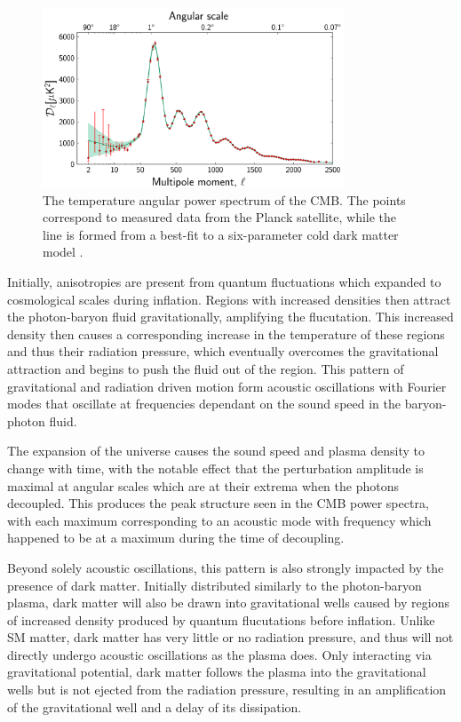 \begin{figure}[htpb]
	\label{fig:CMBpowerSpectrum}
	\centering
	\includegraphics[width=0.8\textwidth]{figures/cmb_power_spectrum.png}
	\caption[The temperature angular power spectrum of the CMB]{The temperature angular power spectrum of the CMB. The points correspond to measured data from the Planck satellite, while the line is formed from a best-fit to a six-parameter cold dark matter model \cite{PlanckCMB}.}
\end{figure}

Initially, anisotropies are present from quantum fluctuations which expanded to cosmological scales during inflation.
Regions with increased densities then attract the photon-baryon fluid gravitationally, amplifying the flucutation.
This increased density then causes a corresponding increase in the temperature of these regions and thus their radiation pressure, which eventually overcomes the gravitational attraction and begins to push the fluid out of the region. 
This pattern of gravitational and radiation driven motion form acoustic oscillations with Fourier modes that oscillate at frequencies dependant on the sound speed in the baryon-photon fluid.

The expansion of the universe causes the sound speed and plasma density to change with time, with the notable effect that the perturbation amplitude is maximal at angular scales which are at their extrema when the photons decoupled. 
This produces the peak structure seen in the CMB power spectra, with each maximum corresponding to an acoustic mode with frequency which happened to be at a maximum during the time of decoupling.

Beyond solely acoustic oscillations, this pattern is also strongly impacted by the presence of dark matter.
Initially distributed similarly to the photon-baryon plasma, dark matter will also be drawn into gravitational wells caused by regions of increased density produced by quantum flucutations before inflation.
Unlike SM matter, dark matter has very little or no radiation pressure, and thus will not directly undergo acoustic oscillations as the plasma does. 
Only interacting via gravitational potential, dark matter follows the plasma into the gravitational wells but is not ejected from the radiation pressure, resulting in an amplification of the gravitational well and a delay of its dissipation. 

